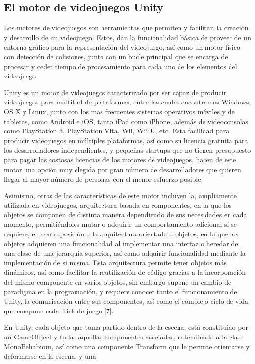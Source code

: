 \subsection{El motor de videojuegos Unity}

Los motores de videojuegos son herramientas que permiten y facilitan la creación y desarrollo de un videojuego. Estos, dan la funcionalidad básica de proveer de un entorno gráfico para la representación del videojuego, así como un motor físico con detección de colisiones, junto con un bucle principal que se encarga de procesar y ceder tiempo de procesamiento para cada uno de los elementos del videojuego.

Unity es un motor de videojuegos caracterizado por ser capaz de producir videojuegos para multitud de plataformas, entre las cuales encontramos Windows, OS X y Linux, junto con los mas frecuentes sistemas operativos móviles y de tabletas, como Android e  iOS, tanto iPad como iPhone, además de videoconsolas como PlayStation 3, PlayStation Vita, Wii, Wii U, etc. Esta facilidad para producir videojuegos en múltiples plataformas, así como su licencia gratuita para los desarrolladores independientes, y pequeñas startups que no tienen presupuesto para pagar las costosas licencias de los motores de videojuegos, hacen de este motor una opción muy elegida por gran número de desarrolladores que quieren llegar al mayor número de personas con el menor esfuerzo posible.

Asimismo, otras de las características de este motor incluyen la, ampliamente utilizada en videojuegos, arquitectura basada en componentes, en la que los objetos se componen de distinta manera dependiendo de sus necesidades en cada momento, permitiéndoles mutar o adquirir un comportamiento adicional si se requiere; en contraposición a la arquitectura orientada a objetos, en la que los objetos adquieren una funcionalidad al implementar una interfaz o heredar de una clase de una jerarquía superior, así como adquirir funcionalidad mediante la implementación de si misma. Esta arquitectura permite tener objetos más dinámicos, así como facilitar la reutilización de código gracias a la incorporación del mismo componente en varios objetos, sin embargo supone un cambio de paradigma en la programación, y requiere conocer tanto el funcionamiento de Unity, la comunicación entre sus componentes, así como el complejo ciclo de vida que compone cada Tick de juego [7].

En Unity, cada objeto que toma partido dentro de la escena, está constituido por un GameObject y todas aquellas componentes asociadas, extendiendo a la clase MonoBehabiour, así como una componente Transform que le permite orientarse y deformarse en la escena, y una


